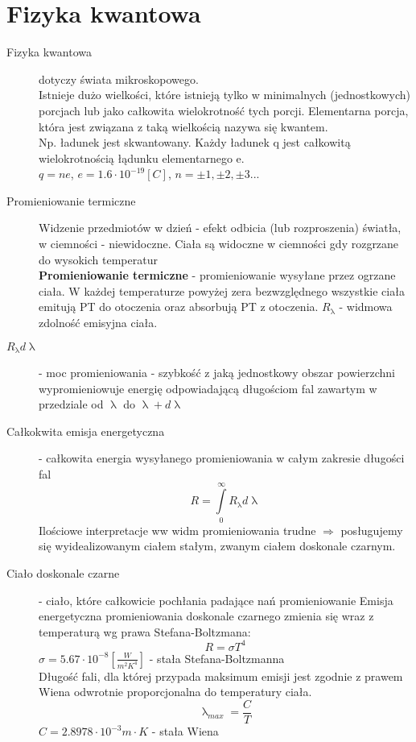 \documentclass[a4paper,11pt]{article}
\begin{document}
\section{Fizyka kwantowa} 
\begin{description}
\item[Fizyka kwantowa] dotyczy świata mikroskopowego. \\
  Istnieje dużo wielkości, które istnieją tylko w minimalnych (jednostkowych) porcjach lub jako całkowita wielokrotność tych porcji. Elementarna porcja, która jest związana z taką wielkością nazywa się kwantem.\\
  Np. ładunek jest skwantowany. Każdy ładunek q jest całkowitą wielokrotnością łądunku elementarnego e.\\
  $q = ne$, $e=1.6\cdot10^{-19}[C]$, $n = \pm1, \pm2, \pm3...$
\item[Promieniowanie termiczne] Widzenie przedmiotów w dzień - efekt odbicia (lub rozproszenia) światła, w ciemności - niewidoczne. Ciała są widoczne w ciemności gdy rozgrzane do wysokich temperatur \\
  \textbf{Promieniowanie termiczne} - promieniowanie wysyłane przez ogrzane ciała. W każdej temperaturze powyżej zera bezwzględnego wszystkie ciała emitują PT do otoczenia oraz absorbują PT z otoczenia. $R_\uplambda$ - widmowa zdolność emisyjna ciała.
\item[$R_\uplambda d\uplambda$] - moc promieniowania - szybkość z jaką jednostkowy obszar powierzchni wypromieniowuje energię odpowiadającą długościom fal zawartym w przedziale od $\uplambda$ do $\uplambda+d\uplambda$
\item[Całkokwita emisja energetyczna] - całkowita energia wysyłanego promieniowania w całym zakresie długości fal
  $$R=\int\limits^\infty_0 R_\uplambda d\uplambda$$
  Ilościowe interpretacje ww widm promieniowania trudne $\Rightarrow$ posługujemy się wyidealizowanym ciałem stałym, zwanym ciałem doskonale czarnym.
\item[Ciało doskonale czarne] - ciało, które całkowicie pochłania padające nań promieniowanie
  Emisja energetyczna promieniowania doskonale czarnego zmienia się wraz z temperaturą wg prawa Stefana-Boltzmana:
  $$R=\sigma T^4$$
  $\sigma = 5.67\cdot 10^{-8} \left[ \frac{W}{m^2K^4}\right]$ - stała Stefana-Boltzmanna\\
  
  Długość fali, dla której przypada maksimum emisji jest zgodnie z prawem Wiena odwrotnie proporcjonalna do temperatury ciała.
  $$\uplambda_{max}=\frac{C}{T}$$
  $C = 2.8978\cdot 10^{-3} m\cdot K$ - stała Wiena


\end{description}
\end{document}
